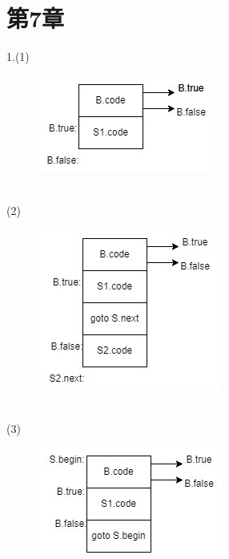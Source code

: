 \documentclass{article}
\begin{document}
\newpage

\section{第7章}
1.(1)
\begin{figure}[htbp]
    \centering
    \includegraphics[scale=0.6]{if_then.png}
    \caption{}
\end{figure}
\\
(2)
\begin{figure}[htbp]
    \centering
    \includegraphics[scale=0.6]{if_then_else.png}
    \caption{}
\end{figure}
\\
(3)
\begin{figure}[htbp]
    \centering
    \includegraphics[scale=0.6]{while_do.png}
    \caption{}
\end{figure}

\newpage
\end{document}
